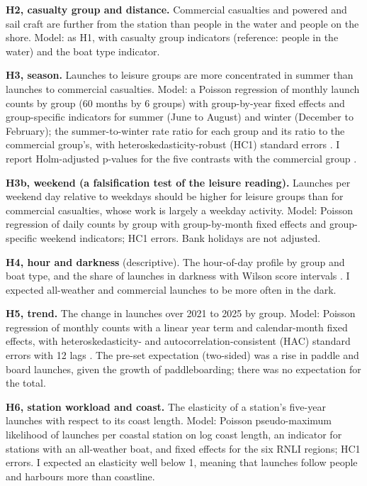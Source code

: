 \documentclass[11pt,a4paper]{article}
\begin{document}
\textbf{H2, casualty group and distance.} Commercial casualties and powered and sail craft are further from the station than people in the water and people on the shore. Model: as H1, with casualty group indicators (reference: people in the water) and the boat type indicator.

\textbf{H3, season.} Launches to leisure groups are more concentrated in summer than launches to commercial casualties. Model: a Poisson regression of monthly launch counts by group (60 months by 6 groups) with group-by-year fixed effects and group-specific indicators for summer (June to August) and winter (December to February); the summer-to-winter rate ratio for each group and its ratio to the commercial group's, with heteroskedasticity-robust (HC1) standard errors \citep{mackinnon1985}. I report Holm-adjusted p-values for the five contrasts with the commercial group \citep{holm1979}.

\textbf{H3b, weekend (a falsification test of the leisure reading).} Launches per weekend day relative to weekdays should be higher for leisure groups than for commercial casualties, whose work is largely a weekday activity. Model: Poisson regression of daily counts by group with group-by-month fixed effects and group-specific weekend indicators; HC1 errors. Bank holidays are not adjusted.

\textbf{H4, hour and darkness} (descriptive). The hour-of-day profile by group and boat type, and the share of launches in darkness with Wilson score intervals \citep{wilson1927}. I expected all-weather and commercial launches to be more often in the dark.

\textbf{H5, trend.} The change in launches over 2021 to 2025 by group. Model: Poisson regression of monthly counts with a linear year term and calendar-month fixed effects, with heteroskedasticity- and autocorrelation-consistent (HAC) standard errors with 12 lags \citep{newey1987}. The pre-set expectation (two-sided) was a rise in paddle and board launches, given the growth of paddleboarding; there was no expectation for the total.

\textbf{H6, station workload and coast.} The elasticity of a station's five-year launches with respect to its coast length. Model: Poisson pseudo-maximum likelihood \citep{santos2006} of launches per coastal station on log coast length, an indicator for stations with an all-weather boat, and fixed effects for the six RNLI regions; HC1 errors. I expected an elasticity well below 1, meaning that launches follow people and harbours more than coastline.
\end{document}
